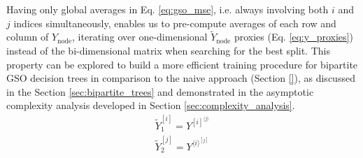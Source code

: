 \documentclass[conference]{IEEEtran}
\newcommand{\el}[1]{^{[#1]}}
\newcommand{\mel}[1]{^{\langle #1 \rangle}}
\newcommand{\avg}[1]{\left\langle#1\right\rangle}
\newcommand{\savg}[1]{\langle#1\rangle}
\begin{document}
%

Having only global averages in Eq. \ref{eq:gso_mse}, i.e. always involving both $i$ and $j$ indices simultaneously, enables us to pre-compute averages of each row and column of $Y_\text{node}$, iterating over one-dimensional $\tilde Y_\text{node}$ proxies (Eq. \ref{eq:y_proxies}) instead of the bi-dimensional matrix when searching for the best split. This property can be explored to build a more efficient training procedure for bipartite GSO decision trees in comparison to the naive approach (Section \ref{}), as discussed in the Section \ref{sec:bipartite_trees} and demonstrated in the asymptotic complexity analysis developed in Section \ref{sec:complexity_analysis}.
%
\begin{equation}
    \begin{split}
        \tilde Y_1\el{i} = Y\el{i}\mel{j}\\
        \tilde Y_2\el{j} = Y\mel{i}\el{j}
    \end{split}
    \label{eq:y_proxies}
\end{equation}
\end{document}
